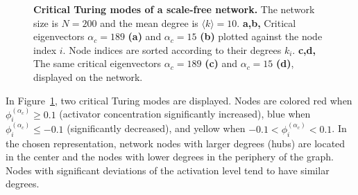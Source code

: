 \begin{figure}[H]
  \caption{\textbf{Critical Turing modes of a scale-free network.} The network size is \(N=200\) and the mean degree is \(\langle k\rangle=10\). \textbf{a,b,} Critical eigenvectors \(\alpha_c=189\) \textbf{(a)} and \(\alpha_c=15\) \textbf{(b)} plotted against the node index \(i\). Node indices are sorted according to their degrees \(k_i\). \textbf{c,d,} The same critical eigenvectors \(\alpha_c=189\) \textbf{(c)} and \(\alpha_c=15\) \textbf{(d)}, displayed on the network.}
  \label{fig:critical_turing_modes1}
\end{figure}

In Figure~\ref{fig:critical_turing_modes1}, two critical Turing modes are displayed. Nodes are colored red when \(\phi_i^{(\alpha_c)} \ge 0.1\) (activator concentration significantly increased), blue when \(\phi_i^{(\alpha_c)} \le -0.1\) (significantly decreased), and yellow when \(-0.1 < \phi_i^{(\alpha_c)} < 0.1\). In the chosen representation, network nodes with larger degrees (hubs) are located in the center and the nodes with lower degrees in the periphery of the graph. Nodes with significant deviations of the activation level tend to have similar degrees.


